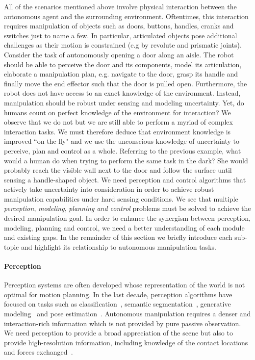 \medskip
All of the scenarios mentioned above involve physical interaction between the autonomous agent and the surrounding environment. Oftentimes, this interaction requires manipulation of objects such as doors, buttons, handles, cranks and switches just to name a few. In particular, articulated objects pose additional challenges as their motion is constrained (e.g by revolute and prismatic joints). Consider the task of autonomously opening a door along an aisle. The robot should be able to perceive the door and its components, model its articulation, elaborate a manipulation plan, e.g. navigate to the door, grasp its handle and finally move the end effector such that the door is pulled open. Furthermore, the robot does not have access to an exact knowledge of the environment. Instead, manipulation should be robust under sensing and modeling uncertainty. Yet, do humans count on perfect knowledge of the environment for interaction? We observe that we do not but we are still able to perform a myriad of complex interaction tasks. We must therefore deduce that environment knowledge is improved ``on-the-fly" and we use the unconscious knowledge of uncertainty to perceive, plan and control as a whole. Referring to the previous example, what would a human do when trying to perform the same task in the dark? She would probably reach the visible wall next to the door and follow the surface until sensing a handle-shaped object. We need perception and control algorithms that actively take uncertainty into consideration in order to achieve robust manipulation capabilities under hard sensing conditions.   
We see that multiple \emph{perception}, \emph{modeling}, \emph{planning and control} problems must be solved to achieve the desired manipulation goal. In order to enhance the synergism between perception, modeling, planning and control, we need a better understanding of each module and existing gaps. In the remainder of this section we briefly introduce each sub-topic and highlight its relationship to autonomous manipulation tasks. 


\paragraph{Perception} Perception systems are often developed whose representation of the world is not optimal for motion planning. In the last decade, perception algorithms have focused on tasks such as classification~\citep{redmon2016you}, semantic segmentation~\cite{badrinarayanan2017segnet}, generative modeling~\citep{karras2019stylebased} and pose estimation~\cite{xiang2017posecnn}. Autonomous manipulation requires a denser and interaction-rich information which is not provided by pure passive observation. We need perception to provide a broad appreciation of the scene but also to provide high-resolution information, including knowledge of the contact locations and forces exchanged~\cite{mason2018toward}. 

